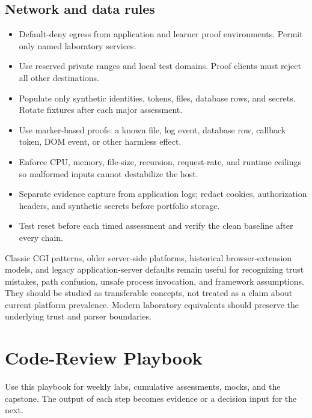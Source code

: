 \documentclass[11pt]{article}
\begin{document}
\subsection{Network and data rules}
\begin{itemize}
  \item Default-deny egress from application and learner proof environments. Permit only named laboratory services.
  \item Use reserved private ranges and local test domains. Proof clients must reject all other destinations.
  \item Populate only synthetic identities, tokens, files, database rows, and secrets. Rotate fixtures after each major assessment.
  \item Use marker-based proofs: a known file, log event, database row, callback token, DOM event, or other harmless effect.
  \item Enforce CPU, memory, file-size, recursion, request-rate, and runtime ceilings so malformed inputs cannot destabilize the host.
  \item Separate evidence capture from application logs; redact cookies, authorization headers, and synthetic secrets before portfolio storage.
  \item Test reset before each timed assessment and verify the clean baseline after every chain.
\end{itemize}

\begin{legacybox}
Classic CGI patterns, older server-side platforms, historical browser-extension
models, and legacy application-server defaults remain useful for recognizing trust
mistakes, path confusion, unsafe process invocation, and framework assumptions.
They should be studied as transferable concepts, not treated as a claim about
current platform prevalence. Modern laboratory equivalents should preserve the
underlying trust and parser boundaries.
\end{legacybox}

\section{Code-Review Playbook}

Use this playbook for weekly labs, cumulative assessments, mocks, and the capstone.
The output of each step becomes evidence or a decision input for the next.
\end{document}

